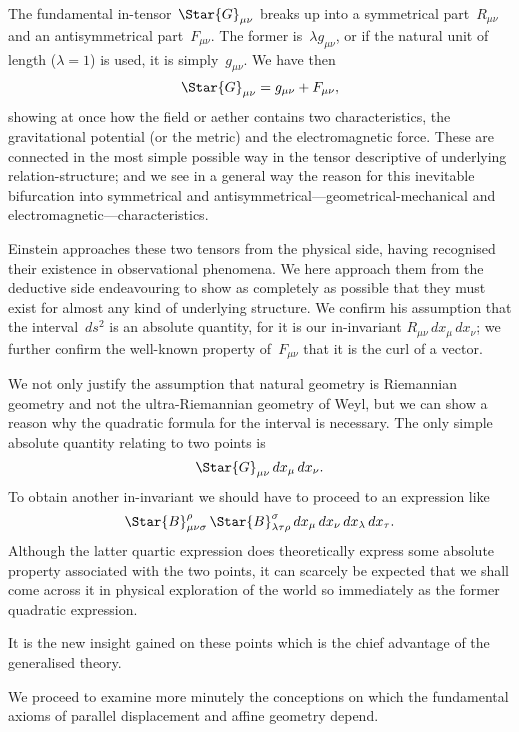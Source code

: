 \documentclass[12pt]{book}
\begin{document}
The fundamental in-tensor~$\Star{G}_{\mu\nu}$ breaks up into a symmetrical part~$R_{\mu\nu}$
and an antisymmetrical part~$F_{\mu\nu}$. The former is~$\lambda g_{\mu\nu}$, or if the natural unit
of length ($\lambda = 1$) is used, it is simply~$g_{\mu\nu}$. We have then
\[
\Star{G}_{\mu\nu} = g_{\mu\nu} + F_{\mu\nu},
\]
showing at once how the field or aether contains two characteristics, the
%
gravitational potential (or the metric) and the electromagnetic force. These
are connected in the most simple possible way in the tensor descriptive of
underlying relation-structure; and we see in a general way the reason for this
%
inevitable bifurcation into symmetrical and antisymmetrical---geometrical-mechanical
and electromagnetic---characteristics.

Einstein approaches these two tensors from the physical side, having
recognised their existence in observational phenomena. We here approach
them from the deductive side endeavouring to show as completely as possible
that they must exist for almost any kind of underlying structure. We confirm
his assumption that the interval~$ds^{2}$ is an absolute quantity, for it is our in-invariant
$R_{\mu\nu}\, dx_{\mu}\, dx_{\nu}$; we further confirm the well-known property of~$F_{\mu\nu}$ that
it is the curl of a vector.

We not only justify the assumption that natural geometry is Riemannian
geometry and not the ultra-Riemannian geometry of Weyl, but we can show
a reason why the quadratic formula for the interval is necessary. The only
simple absolute quantity relating to two points is
\[
\Star{G}_{\mu\nu}\, dx_{\mu}\, dx_{\nu}.
\]
To obtain another in-invariant we should have to proceed to an expression like
\[
\Star{B}_{\mu\nu\sigma}^{\rho}\, \Star{B}_{\lambda\tau\rho}^{\sigma}\, dx_{\mu}\, dx_{\nu}\, dx_{\lambda}\, dx_{\tau}.
\]
Although the latter quartic expression does theoretically express some absolute
property associated with the two points, it can scarcely be expected that
we shall come across it in physical exploration of the world so immediately as
the former quadratic expression.

It is the new insight gained on these points which is the chief advantage
of the generalised theory.

%
%

We proceed to examine more minutely the conceptions on which the
fundamental axioms of parallel displacement and affine geometry depend.
\end{document}
